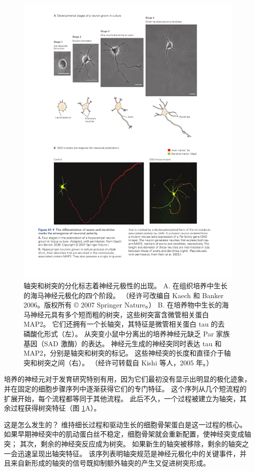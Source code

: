 \begin{figure}[htbp]
	\centering
	\includegraphics[width=0.75\linewidth]{chap47/fig_47_1}
	\caption{轴突和树突的分化标志着神经元极性的出现。 A. 在组织培养中生长的海马神经元极化的四个阶段。 （经许可改编自 Kaech 和 Banker 2006。版权所有 © 2007 Springer Nature。） B. 在培养物中生长的海马神经元具有多个短而粗的树突，这些树突富含微管相关蛋白 MAP2。 它们还拥有一个长轴突，其特征是微管相关蛋白 tau 的去磷酸化形式（左）。 从突变小鼠中分离出的培养神经元缺乏 Par 家族基因（SAD 激酶）的表达。 神经元生成的神经突同时表达 tau 和 MAP2，分别是轴突和树突的标记。 这些神经突的长度和直径介于轴突和树突之间（右）。 （经许可转载自 Kishi 等人，2005 年。）}
	\label{fig:47_1}
\end{figure}

培养的神经元对于发育研究特别有用，因为它们最初没有显示出明显的极化迹象，并在固定的细胞步骤序列中逐渐获得它们的专门特征。 这个序列从几个短流程的扩展开始，每个流程都等同于其他流程。 此后不久，一个过程被建立为轴突，其余过程获得树突特征（图 \ref{fig:47_1}A）。

这是怎么发生的？ 维持细长过程和驱动生长的细胞骨架蛋白是这一过程的核心。 如果早期神经突中的肌动蛋白丝不稳定，细胞骨架就会重新配置，使神经突变成轴突； 其次，剩余的神经突反应成为树突。 如果新生的轴突被移除，剩余的轴突之一会迅速呈现出轴突特征。 该序列表明轴突规范是神经元极化中的关键事件，并且来自新形成的轴突的信号既抑制额外轴突的产生又促进树突形成。

